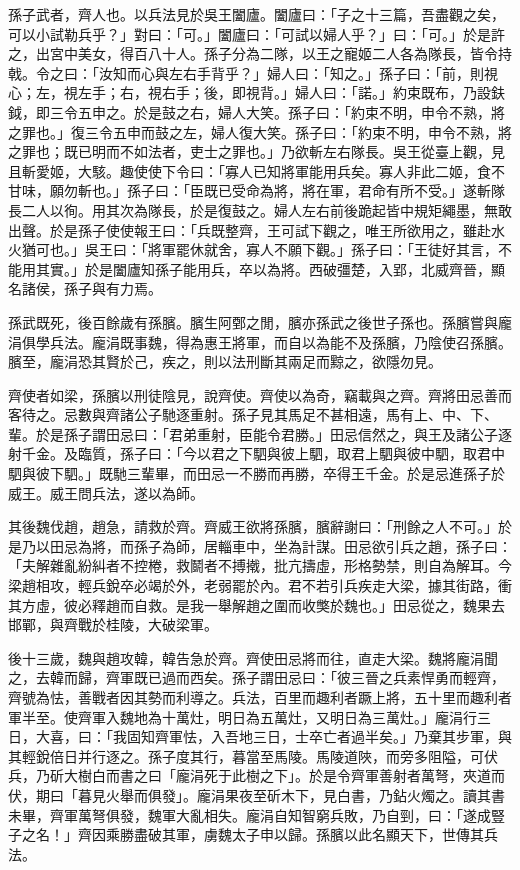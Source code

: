 
\begin{pinyinscope}
孫子武者，齊人也。以兵法見於吳王闔廬。闔廬曰：「子之十三篇，吾盡觀之矣，可以小試勒兵乎？」對曰：「可。」闔廬曰：「可試以婦人乎？」曰：「可。」於是許之，出宮中美女，得百八十人。孫子分為二隊，以王之寵姬二人各為隊長，皆令持戟。令之曰：「汝知而心與左右手背乎？」婦人曰：「知之。」孫子曰：「前，則視心；左，視左手；右，視右手；後，即視背。」婦人曰：「諾。」約束既布，乃設鈇鉞，即三令五申之。於是鼓之右，婦人大笑。孫子曰：「約束不明，申令不熟，將之罪也。」復三令五申而鼓之左，婦人復大笑。孫子曰：「約束不明，申令不熟，將之罪也；既已明而不如法者，吏士之罪也。」乃欲斬左右隊長。吳王從臺上觀，見且斬愛姬，大駭。趣使使下令曰：「寡人已知將軍能用兵矣。寡人非此二姬，食不甘味，願勿斬也。」孫子曰：「臣既已受命為將，將在軍，君命有所不受。」遂斬隊長二人以徇。用其次為隊長，於是復鼓之。婦人左右前後跪起皆中規矩繩墨，無敢出聲。於是孫子使使報王曰：「兵既整齊，王可試下觀之，唯王所欲用之，雖赴水火猶可也。」吳王曰：「將軍罷休就舍，寡人不願下觀。」孫子曰：「王徒好其言，不能用其實。」於是闔廬知孫子能用兵，卒以為將。西破彊楚，入郢，北威齊晉，顯名諸侯，孫子與有力焉。

孫武既死，後百餘歲有孫臏。臏生阿鄄之閒，臏亦孫武之後世子孫也。孫臏嘗與龐涓俱學兵法。龐涓既事魏，得為惠王將軍，而自以為能不及孫臏，乃陰使召孫臏。臏至，龐涓恐其賢於己，疾之，則以法刑斷其兩足而黥之，欲隱勿見。

齊使者如梁，孫臏以刑徒陰見，說齊使。齊使以為奇，竊載與之齊。齊將田忌善而客待之。忌數與齊諸公子馳逐重射。孫子見其馬足不甚相遠，馬有上、中、下、輩。於是孫子謂田忌曰：「君弟重射，臣能令君勝。」田忌信然之，與王及諸公子逐射千金。及臨質，孫子曰：「今以君之下駟與彼上駟，取君上駟與彼中駟，取君中駟與彼下駟。」既馳三輩畢，而田忌一不勝而再勝，卒得王千金。於是忌進孫子於威王。威王問兵法，遂以為師。

其後魏伐趙，趙急，請救於齊。齊威王欲將孫臏，臏辭謝曰：「刑餘之人不可。」於是乃以田忌為將，而孫子為師，居輜車中，坐為計謀。田忌欲引兵之趙，孫子曰：「夫解雜亂紛糾者不控棬，救鬬者不搏撠，批亢擣虛，形格勢禁，則自為解耳。今梁趙相攻，輕兵銳卒必竭於外，老弱罷於內。君不若引兵疾走大梁，據其街路，衝其方虛，彼必釋趙而自救。是我一舉解趙之圍而收獘於魏也。」田忌從之，魏果去邯鄲，與齊戰於桂陵，大破梁軍。

後十三歲，魏與趙攻韓，韓告急於齊。齊使田忌將而往，直走大梁。魏將龐涓聞之，去韓而歸，齊軍既已過而西矣。孫子謂田忌曰：「彼三晉之兵素悍勇而輕齊，齊號為怯，善戰者因其勢而利導之。兵法，百里而趣利者蹶上將，五十里而趣利者軍半至。使齊軍入魏地為十萬灶，明日為五萬灶，又明日為三萬灶。」龐涓行三日，大喜，曰：「我固知齊軍怯，入吾地三日，士卒亡者過半矣。」乃棄其步軍，與其輕銳倍日并行逐之。孫子度其行，暮當至馬陵。馬陵道陜，而旁多阻隘，可伏兵，乃斫大樹白而書之曰「龐涓死于此樹之下」。於是令齊軍善射者萬弩，夾道而伏，期曰「暮見火舉而俱發」。龐涓果夜至斫木下，見白書，乃鉆火燭之。讀其書未畢，齊軍萬弩俱發，魏軍大亂相失。龐涓自知智窮兵敗，乃自剄，曰：「遂成豎子之名！」齊因乘勝盡破其軍，虜魏太子申以歸。孫臏以此名顯天下，世傳其兵法。


\end{pinyinscope}

